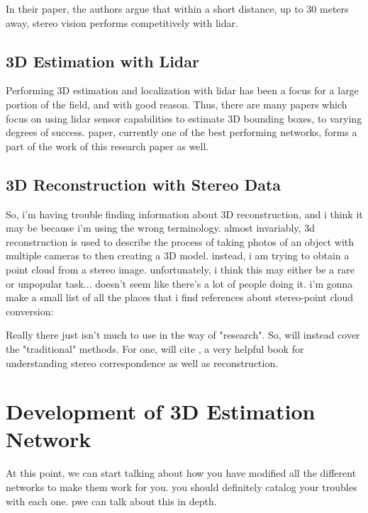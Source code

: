 In their paper, the authors argue that within a short distance, up to 30 meters away, stereo vision performs competitively with lidar.

\subsection{3D Estimation with Lidar}
Performing 3D estimation and localization with lidar has been a focus for a large portion of the field, and with good reason. Thus, there are many papers which focus on using lidar sensor capabilities to estimate 3D bounding boxes, to varying degrees of success. \cite{qi_frustum_2017} paper, currently one of the best performing networks, forms a part of the work of this research paper as well. 

\subsection{3D Reconstruction with Stereo Data}
So, i'm having trouble finding information about 3D reconstruction, and i think it may be because i'm using the wrong terminology. almost invariably, 3d reconstruction is used to describe the process of taking photos of an object with multiple cameras to then creating a 3D model. instead, i am trying to obtain a point cloud from a stereo image. unfortunately, i think this may either be a rare or unpopular task... doesn't seem like there's a lot of people doing it. i'm gonna make a small list of all the places that i find references about stereo-point cloud conversion: 

Really there just isn't much to use in the way of "research". So, will instead cover the "traditional" methods. For one, will cite \cite{szeliski_computer_2010}, a very helpful book for understanding stereo correspondence as well as reconstruction.






\section{Development of 3D Estimation Network}
At this point, we can start talking about how you have modified all the different networks to make them work for you. you should definitely catalog your troubles with each one. pwe can talk about this in depth. 


